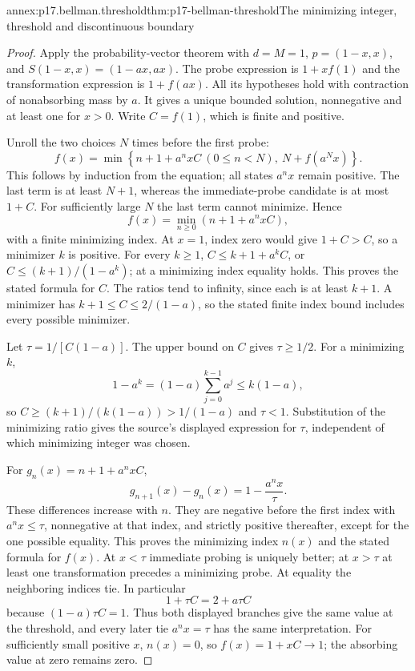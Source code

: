 \begin{annexitem}{annex:p17.bellman.threshold}{thm:p17-bellman-threshold}{The minimizing integer, threshold and discontinuous boundary}
\begin{proof}
Apply the probability-vector
theorem with \(d=M=1\),
\(p=(1-x,x)\), and
\(S(1-x,x)=(1-ax,ax)\).
The probe expression is
\(1+x f(1)\) and the
transformation expression is
\(1+f(ax)\).
All its hypotheses hold
with contraction of
nonabsorbing mass by \(a\).
It gives a unique bounded
solution, nonnegative and
at least one for \(x>0\).
Write \(C=f(1)\), which
is finite and positive.

Unroll the two choices \(N\)
times before the first probe:
\[
 f(x)=\min\left\{
          n+1+a^nxC\ (0\leq n<N),\
                              N+f(a^Nx)\right\}.
\]
This follows by induction
from the equation; all
states \(a^nx\) remain
positive. The last term is
at least \(N+1\), whereas
the immediate-probe candidate
is at most \(1+C\).
For sufficiently large \(N\)
the last term cannot minimize.
Hence
\[
                   f(x)=\min_{n\geq0}(n+1+a^nxC),
\]
with a finite minimizing
index. At \(x=1\), index
zero would give \(1+C>C\),
so a minimizer \(k\) is
positive. For every \(k\geq1\),
\(C\leq k+1+a^kC\), or
\(C\leq(k+1)/(1-a^k)\);
at a minimizing index
equality holds. This proves
the stated formula for \(C\).
The ratios tend to infinity,
since each is at least
\(k+1\). A minimizer has
\(k+1\leq C\leq2/(1-a)\),
so the stated finite index
bound includes every possible
minimizer.

Let \(\tau=1/[C(1-a)]\).
The upper bound on \(C\)
gives \(\tau\geq1/2\).
For a minimizing \(k\),
\[
       1-a^k=(1-a)\sum_{j=0}^{k-1}a^j
                                      \leq k(1-a),
\]
so \(C\geq(k+1)/(k(1-a))>1/(1-a)\) and
\(\tau<1\).
Substitution of the minimizing
ratio gives the source's
displayed expression for
\(\tau\), independent of
which minimizing integer
was chosen.

For \(g_n(x)=n+1+a^nxC\),
\[
             g_{n+1}(x)-g_n(x)
                         =1-\frac{a^nx}{\tau}.
\]
These differences increase
with \(n\). They are
negative before the first
index with \(a^nx\leq\tau\),
nonnegative at that index,
and strictly positive
thereafter, except for
the one possible equality.
This proves the minimizing
index \(n(x)\) and the
stated formula for \(f(x)\).
At \(x<\tau\) immediate
probing is uniquely better;
at \(x>\tau\) at least
one transformation precedes
a minimizing probe.
At equality the neighboring
indices tie. In particular
\[
          1+\tau C=2+a\tau C
\]
because \((1-a)\tau C=1\).
Thus both displayed branches
give the same value at the
threshold, and every later
tie \(a^nx=\tau\) has the
same interpretation.
For sufficiently small
positive \(x\), \(n(x)=0\),
so \(f(x)=1+xC\to1\);
the absorbing value at
zero remains zero.


\end{proof}
\end{annexitem}
